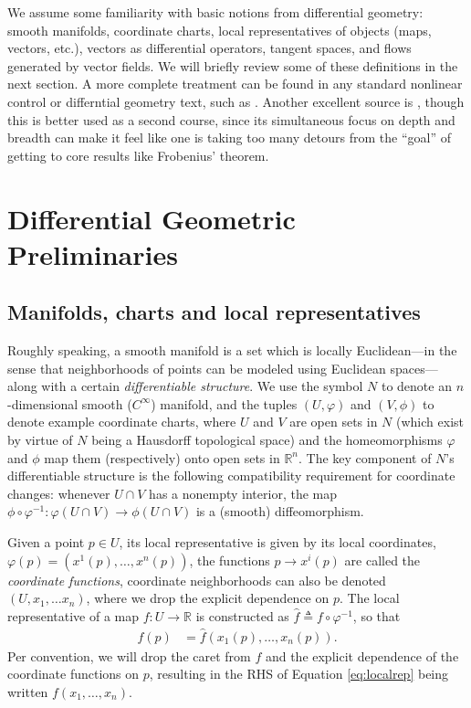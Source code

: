 \documentclass[psamsfonts]{amsart}
\theoremstyle{definition}
\theoremstyle{remark}
\newcommand*\R{\mathds{R}}
\numberwithin{equation}{section}
\begin{document}
We assume some familiarity with basic notions from differential geometry: smooth manifolds, coordinate charts, local representatives of objects (maps, vectors, etc.), vectors as differential operators, tangent spaces, and flows generated by vector fields. We will briefly review some of these definitions in the next section. A more complete treatment can be found in any standard nonlinear control or differntial geometry text, such as \cite{nijmeijer_nonlinear_1990,boothby_2002}. Another excellent source is \cite{abraham_manifolds_1988}, though this is better used as a second course, since its simultaneous focus on depth and breadth can make it feel like one is taking too many detours from the ``goal'' of getting to core results like Frobenius' theorem. 

\section{Differential Geometric Preliminaries}
\subsection{Manifolds, charts and local representatives}

Roughly speaking, a smooth manifold is a set which is locally Euclidean---in the sense that neighborhoods of points can be modeled using Euclidean spaces---along with a certain \textit{differentiable structure}. We use the symbol $N$ to denote an $n$-dimensional smooth ($C^{\infty}$) manifold, and the tuples $(U, \varphi)$ and $(V, \phi)$ to denote example coordinate charts, where $U$ and $V$ are open sets in $N$ (which exist by virtue of $N$ being a Hausdorff topological space) and the homeomorphisms $\varphi$ and $\phi$ map them (respectively) onto open sets in $\R^n$. The key component of $N$'s differentiable structure is the following compatibility requirement for coordinate changes: whenever $U \cap V$ has a nonempty interior, the map $\phi\circ\varphi^{-1}: \varphi(U\cap V) \rightarrow \phi(U\cap V)$ is a (smooth) diffeomorphism. %

Given a point $p\in U$, its local representative is given by its local coordinates, $\varphi (p) = (x^1(p), \dots, x^n(p))$, the functions $p \rightarrow x^i(p)$ are called the \textit{coordinate functions}, coordinate neighborhoods can also be denoted $(U, x_1, \dots x_n)$, where we drop the explicit dependence on $p$. The local representative of a map $f:U\rightarrow \R$ is constructed as $\hat f \triangleq f\circ \varphi^{-1}$, so that 
\begin{align}\label{eq:localrep}
f(p) & = \hat f(x_1(p), \dots, x_n(p)).
\end{align}
Per convention, we will drop the caret from $f$ and the explicit dependence of the coordinate functions on $p$, resulting in the RHS of Equation \ref{eq:localrep} being written $f(x_1, \dots, x_n)$. 
\end{document}
